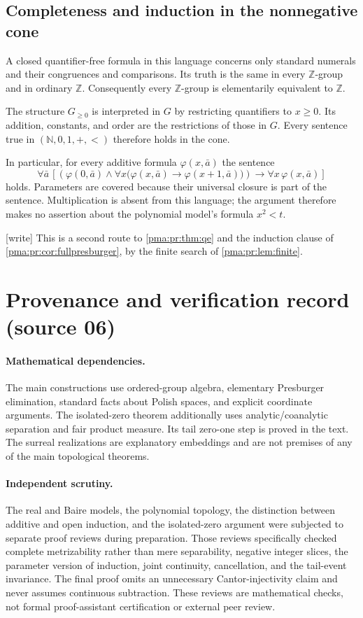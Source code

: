 \documentclass[11pt]{article}
\numberwithin{equation}{section}
\theoremstyle{definition}
\theoremstyle{remark}
\newcommand{\N}{\mathbb N}
\newcommand{\Z}{\mathbb Z}
\newcommand{\writetag}{\textup{\textsf{\small[write]}}}
\begin{document}
\subsection{Completeness and induction in the nonnegative cone}

A closed quantifier-free formula in this language concerns only
standard numerals and their congruences and comparisons. Its truth
is the same in every $\Z$-group and in ordinary $\Z$.
Consequently every $\Z$-group is elementarily equivalent to $\Z$.

The structure $G_{\geq0}$ is interpreted in $G$ by restricting
quantifiers to $x\geq0$. Its addition, constants, and order are the
restrictions of those in $G$. Every sentence true in
$(\N,0,1,+,<)$ therefore holds in the cone.

In particular, for every additive formula $\varphi(x,\bar a)$ the
sentence
\[
 \forall\bar a\,
 \left[
 \left(\varphi(0,\bar a)\wedge
  \forall x\bigl(\varphi(x,\bar a)\to\varphi(x+1,\bar a)\bigr)\right)
 \to\forall x\,\varphi(x,\bar a)
 \right]
\]
holds. Parameters are covered because their universal closure is
part of the sentence. Multiplication is absent from this
language; the argument therefore makes no assertion about the
polynomial model's formula $x^2<t$.

\noindent\writetag{} This is a second route to \cref{pma:pr:thm:qe} and the
induction clause of \cref{pma:pr:cor:fullpresburger}, by the finite search of
\cref{pma:pr:lem:finite}.

\section{Provenance and verification record (source 06)}
\label{pma:cp:app:verification}

\paragraph{Mathematical dependencies.}
The main constructions use ordered-group algebra, elementary
Presburger elimination, standard facts about Polish spaces, and
explicit coordinate arguments. The isolated-zero theorem additionally
uses analytic/coanalytic separation and fair product measure.
Its tail zero-one step is proved in the text. The surreal realizations
are explanatory embeddings and are not premises of any of the main
topological theorems.

\paragraph{Independent scrutiny.}
The real and Baire models, the polynomial topology, the distinction
between additive and open induction, and the isolated-zero argument
were subjected to separate proof reviews during preparation. Those
reviews specifically checked complete metrizability rather than mere
separability, negative integer slices, the parameter version of
induction, joint continuity, cancellation, and the tail-event
invariance. The final proof omits an unnecessary Cantor-injectivity
claim and never assumes continuous subtraction. These reviews are
mathematical checks, not formal proof-assistant certification or
external peer review.
\end{document}
